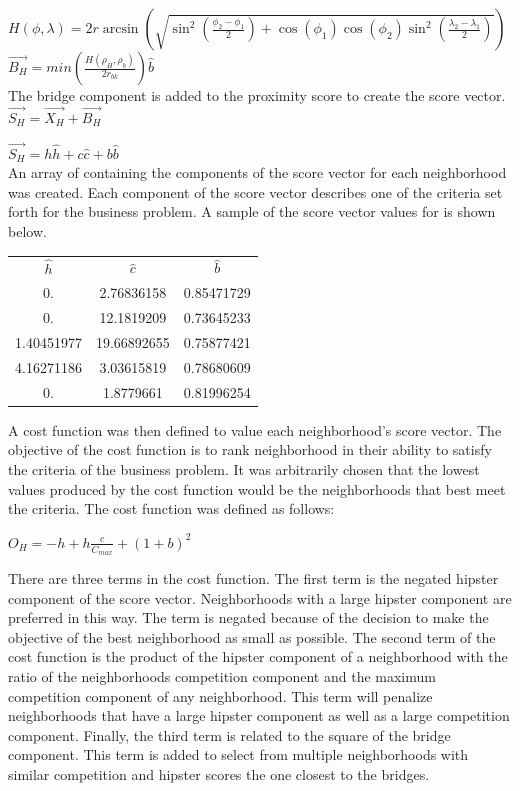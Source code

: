 \documentclass[12pt]{article}
\begin{document}
$\displaystyle{H(\phi,\lambda) = 2r\arcsin\left(\sqrt{\sin^2\left(\frac{\phi_2 - \phi_1}{2}\right) + \cos(\phi_1) \cos(\phi_2)\sin^2\left(\frac{\lambda_2 - \lambda_1}{2}\right)}\right)}$\\


$\displaystyle{ \vec{B_H} = min(\frac{H(\rho_{H},\rho_{b})}{2r_{bk}})\hat{b} }$\\
	
	The bridge component is added to the proximity score to create the score vector.\\

$\displaystyle{\vec{S_H} = \vec{X_H} + \vec{B_H}}$

$\displaystyle{\vec{S_H} = h\hat{h} + c\hat{c} +b\hat{b}}$\\

	An array of containing the components of the score vector for each neighborhood was created.
	Each component of the score vector describes one of the criteria set forth for the business problem.
	A sample of the score vector values for is shown below.
\begin{center}
\begin{tabular}{ c c c }
	$\hat{h}$	&$\hat{c}$	&$\hat{b}$ \\
		0.          &2.76836158  &0.85471729 \\
		0.         &12.1819209   &0.73645233 \\
		1.40451977 &19.66892655  &0.75877421 \\
		4.16271186  &3.03615819  &0.78680609 \\
		0.          &1.8779661   &0.81996254 \\
\end{tabular}
\end{center}
	
	A cost function was then defined to value each neighborhood's score vector.
	The objective of the cost function is to rank neighborhood in their ability to satisfy the criteria of the business problem.
	It was arbitrarily chosen that the lowest values produced by the cost function would be the neighborhoods that best meet the criteria.
	The cost function was defined as follows:
\begin{center}
$\displaystyle{O_H = -h +h\frac{c}{C_{max}}+(1+b)^2}$
\end{center}	

	There are three terms in the cost function.
	The first term is the negated hipster component of the score vector.
	Neighborhoods with a large hipster component are preferred in this way.
	The term is negated because of the decision to make the objective of the best neighborhood as small as possible.
	The second term of the cost function is the product of the hipster component of a neighborhood with the ratio of the neighborhoods competition component and the maximum competition component of any neighborhood.
	This term will penalize neighborhoods that have a large hipster component as well as a large competition component.
	Finally, the third term is related to the square of the bridge component.
	This term is added to select from multiple neighborhoods with similar competition and hipster scores the one closest to the bridges.
\end{document}
